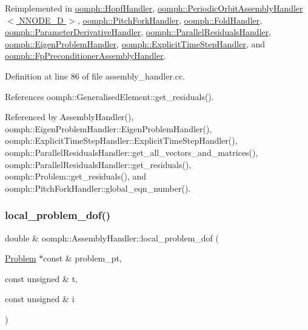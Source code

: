 Reimplemented in \hyperlink{classoomph_1_1HopfHandler_a61a4006161da6532a9acfec0f979aafa}{oomph\+::\+Hopf\+Handler}, \hyperlink{classoomph_1_1PeriodicOrbitAssemblyHandler_af43abc524b34d8e8035e2c2323e2fc87}{oomph\+::\+Periodic\+Orbit\+Assembly\+Handler$<$ N\+N\+O\+D\+E\+\_\+D $>$}, \hyperlink{classoomph_1_1PitchForkHandler_a461b24284da88b9489d720e484a6925c}{oomph\+::\+Pitch\+Fork\+Handler}, \hyperlink{classoomph_1_1FoldHandler_abfbec6da3dffeaf3b4df0ee4955101fd}{oomph\+::\+Fold\+Handler}, \hyperlink{classoomph_1_1ParameterDerivativeHandler_a8ba1dbc805c00ac75e6d5d53f1b014c1}{oomph\+::\+Parameter\+Derivative\+Handler}, \hyperlink{classoomph_1_1ParallelResidualsHandler_a9a4e40b86cfb1db2b4c770d8d7241ad1}{oomph\+::\+Parallel\+Residuals\+Handler}, \hyperlink{classoomph_1_1EigenProblemHandler_a0dc97e08638986970c7ca5f3903c8b6d}{oomph\+::\+Eigen\+Problem\+Handler}, \hyperlink{classoomph_1_1ExplicitTimeStepHandler_aef8ab1b61aef072b2bcb061dd287a00f}{oomph\+::\+Explicit\+Time\+Step\+Handler}, and \hyperlink{classoomph_1_1FpPreconditionerAssemblyHandler_adfebe7f48f6fc715c258e1733218b12b}{oomph\+::\+Fp\+Preconditioner\+Assembly\+Handler}.



Definition at line 86 of file assembly\+\_\+handler.\+cc.



References oomph\+::\+Generalised\+Element\+::get\+\_\+residuals().



Referenced by Assembly\+Handler(), oomph\+::\+Eigen\+Problem\+Handler\+::\+Eigen\+Problem\+Handler(), oomph\+::\+Explicit\+Time\+Step\+Handler\+::\+Explicit\+Time\+Step\+Handler(), oomph\+::\+Parallel\+Residuals\+Handler\+::get\+\_\+all\+\_\+vectors\+\_\+and\+\_\+matrices(), oomph\+::\+Parallel\+Residuals\+Handler\+::get\+\_\+residuals(), oomph\+::\+Problem\+::get\+\_\+residuals(), and oomph\+::\+Pitch\+Fork\+Handler\+::global\+\_\+eqn\+\_\+number().

\mbox{\label{classoomph_1_1AssemblyHandler_ab61559fc5df46871c1eebd103f7bf08b}} 
\subsubsection{\texorpdfstring{local\+\_\+problem\+\_\+dof()}{local\_problem\_dof()}}
{\footnotesize\ttfamily double \& oomph\+::\+Assembly\+Handler\+::local\+\_\+problem\+\_\+dof (\begin{DoxyParamCaption}\item[{\hyperlink{classoomph_1_1Problem}{Problem} $\ast$const \&}]{problem\+\_\+pt,  }\item[{const unsigned \&}]{t,  }\item[{const unsigned \&}]{i }\end{DoxyParamCaption})\hspace{0.3cm}{\ttfamily [virtual]}}



